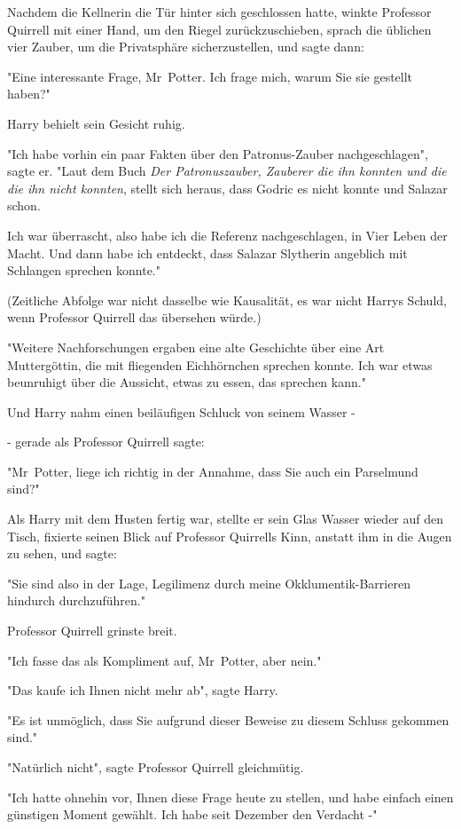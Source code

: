 {Nachdem die Kellnerin die Tür hinter sich geschlossen hatte, winkte Professor Quirrell mit einer Hand, um den Riegel zurückzuschieben, sprach die üblichen vier Zauber, um die Privatsphäre sicherzustellen, und sagte dann:

"Eine interessante Frage, Mr~Potter. Ich frage mich, warum Sie sie gestellt haben?"

Harry behielt sein Gesicht ruhig.

"Ich habe vorhin ein paar Fakten über den Patronus-Zauber nachgeschlagen", sagte er. "Laut dem Buch \emph{Der Patronuszauber, Zauberer die ihn konnten und die die ihn nicht konnten}, stellt sich heraus, dass Godric es nicht konnte und Salazar schon.

Ich war überrascht, also habe ich die Referenz nachgeschlagen, in Vier Leben der Macht. Und dann habe ich entdeckt, dass Salazar Slytherin angeblich mit Schlangen sprechen konnte."

(Zeitliche Abfolge war nicht dasselbe wie Kausalität, es war nicht Harrys Schuld, wenn Professor Quirrell das übersehen würde.)

"Weitere Nachforschungen ergaben eine alte Geschichte über eine Art Muttergöttin, die mit fliegenden Eichhörnchen sprechen konnte. Ich war etwas beunruhigt über die Aussicht, etwas zu essen, das sprechen kann."

Und Harry nahm einen beiläufigen Schluck von seinem Wasser -

- gerade als Professor Quirrell sagte:

"Mr~Potter, liege ich richtig in der Annahme, dass Sie auch ein Parselmund sind?"

Als Harry mit dem Husten fertig war, stellte er sein Glas Wasser wieder auf den Tisch, fixierte seinen Blick auf Professor Quirrells Kinn, anstatt ihm in die Augen zu sehen, und sagte:

"Sie sind also in der Lage, Legilimenz durch meine Okklumentik-Barrieren hindurch durchzuführen."

Professor Quirrell grinste breit.

"Ich fasse das als Kompliment auf, Mr~Potter, aber nein."

"Das kaufe ich Ihnen nicht mehr ab", sagte Harry.

"Es ist unmöglich, dass Sie aufgrund dieser Beweise zu diesem Schluss gekommen sind."

"Natürlich nicht", sagte Professor Quirrell gleichmütig.

"Ich hatte ohnehin vor, Ihnen diese Frage heute zu stellen, und habe einfach einen günstigen Moment gewählt. Ich habe seit Dezember den Verdacht -"

}
